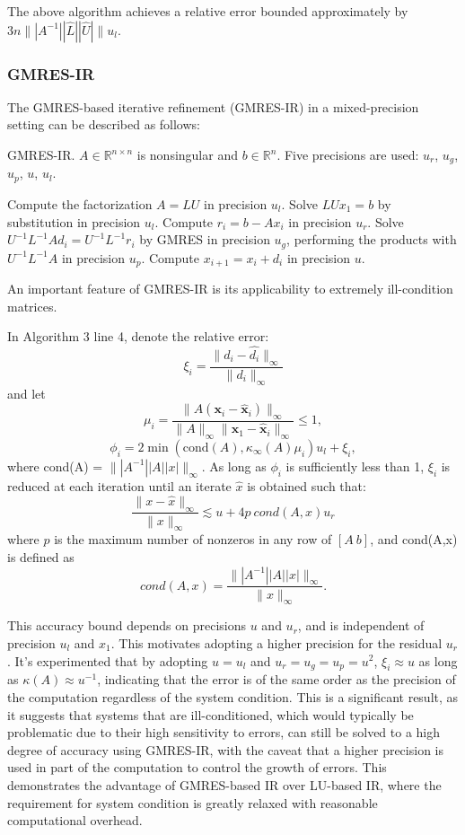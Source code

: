 The above algorithm achieves a relative error bounded approximately by $3n\||A^{-1}||\hat{L}||\hat{U}|\|u_l$\cite{Azzam2020}.


\subsubsection{GMRES-IR}
The GMRES-based iterative refinement (GMRES-IR) in a mixed-precision setting can be described as follows:

\begin{algorithm}
    \caption{GMRES-IR. $A \in \mathbb{R}^{n \times n}$ is nonsingular and $b \in \mathbb{R}^n$. Five precisions are used: $u_r$, $u_g$, $u_p$, $u$, $u_l$.}
    \begin{algorithmic}[1]
        \State Compute the factorization $A = LU$ in precision $u_l$.
        \State Solve $LUx_1 = b$ by substitution in precision $u_l$.
            \State Compute $r_i = b - Ax_i$ in precision $u_r$.
            \State Solve $U^{-1}L^{-1}Ad_i = U^{-1}L^{-1}r_i$ by GMRES in precision $u_g$, performing the products with $U^{-1}L^{-1}A$ in precision $u_p$.
            \State Compute $x_{i+1} = x_i + d_i$ in precision $u$.
        \EndFor
    \end{algorithmic}
\end{algorithm}

An important feature of GMRES-IR is its applicability to extremely ill-condition matrices.

In Algorithm 3 line 4, denote the relative error:
\[
    \xi_i = \frac{\|d_i - \hat{d_i}\|_{\infty}}{\|d_i\|_{\infty}}
\]
and let
\[
\mu_i = \frac{\|A(\mathbf{x}_i - \hat{\mathbf{x}}_i)\|_{\infty}}{\|A\|_{\infty}\|\mathbf{x}_1 - \hat{\mathbf{x}}_i\|_{\infty}} \leq 1,
\]
\[
\phi_i = 2 \min(\text{cond}(A), \kappa_{\infty}(A)\mu_i) u_l + \xi_i,
\]
where cond(A) = $\||A^{-1}||A||x|\|_\infty$.
As long as $\phi_i$ is sufficiently less than 1, $\xi_i$ is reduced at each iteration until an iterate $\hat{x}$ is obtained such that:
\[
    \frac{\|x - \hat{x}\|_{\infty}}{\|x\|_{\infty}} \lesssim u+4p\ cond(A,x)u_r
\]
where $p$ is the maximum number of nonzeros in any row of $[A\ b]$, and cond(A,x) is defined as
\[
cond(A,x)=\frac{\||A^{-1}||A||x|\|_{\infty}}{\|x\|_{\infty}}.
\]


This accuracy bound depends on precisions $u$ and $u_r$, and is independent of precision $u_l$ and $x_1$. This motivates adopting a higher precision for the residual $u_r$. It's experimented that by adopting $u=u_l$ and $u_r=u_g=u_p=u^2$, $\xi_i\approx u$ as long as $\kappa(A)\approx u^{-1}$, indicating that the error is of the same order as the precision of the computation regardless of the system condition. This is a significant result, as it suggests that systems that are ill-conditioned, which would typically be problematic due to their high sensitivity to errors, can still be solved to a high degree of accuracy using GMRES-IR, with the caveat that a higher precision is used in part of the computation to control the growth of errors. This demonstrates the advantage of GMRES-based IR over LU-based IR, where the requirement for system condition is greatly relaxed with reasonable computational overhead\cite{Boris2021}. 

